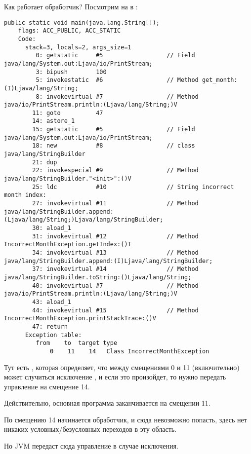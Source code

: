 Как работает обработчик?
Посмотрим на \main в :

\begin{lstlisting}[caption=Month2.class]
  public static void main(java.lang.String[]);
    flags: ACC_PUBLIC, ACC_STATIC
    Code:
      stack=3, locals=2, args_size=1
         0: getstatic     #5                  // Field java/lang/System.out:Ljava/io/PrintStream;
         3: bipush        100
         5: invokestatic  #6                  // Method get_month:(I)Ljava/lang/String;
         8: invokevirtual #7                  // Method java/io/PrintStream.println:(Ljava/lang/String;)V
        11: goto          47
        14: astore_1      
        15: getstatic     #5                  // Field java/lang/System.out:Ljava/io/PrintStream;
        18: new           #8                  // class java/lang/StringBuilder
        21: dup           
        22: invokespecial #9                  // Method java/lang/StringBuilder."<init>":()V
        25: ldc           #10                 // String incorrect month index: 
        27: invokevirtual #11                 // Method java/lang/StringBuilder.append:(Ljava/lang/String;)Ljava/lang/StringBuilder;
        30: aload_1       
        31: invokevirtual #12                 // Method IncorrectMonthException.getIndex:()I
        34: invokevirtual #13                 // Method java/lang/StringBuilder.append:(I)Ljava/lang/StringBuilder;
        37: invokevirtual #14                 // Method java/lang/StringBuilder.toString:()Ljava/lang/String;
        40: invokevirtual #7                  // Method java/io/PrintStream.println:(Ljava/lang/String;)V
        43: aload_1       
        44: invokevirtual #15                 // Method IncorrectMonthException.printStackTrace:()V
        47: return        
      Exception table:
         from    to  target type
             0    11    14   Class IncorrectMonthException
\end{lstlisting}

Тут есть , которая определяет, что между смещениями 0 и 11 (включительно)
может случиться исключение , и если это произойдет, то нужно передать
управление на смещение 14.

Действительно, основная программа заканчивается на смещении 11.

По смещению 14 начинается обработчик, и сюда невозможно попасть, 
здесь нет никаких условных/безусловных переходов в эту область.

Но \ac{JVM} передаст сюда управление в случае исключения.


